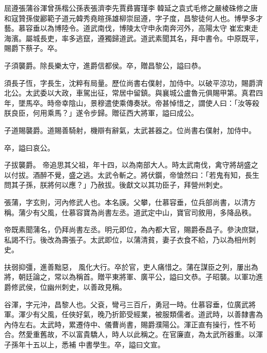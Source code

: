 
\begin{pinyinscope}

 屈遵張蒲谷渾曾孫楷公孫表張濟李先賈彞竇瑾李韓延之袁式毛修之嚴棱硃修之唐和寇贊孫俊酈範子道元韓秀堯暄孫雄柳崇屈遵，字子度，昌黎徒何人也。博學多才藝。慕容垂以為博陸令。道武南伐，博陵太守申永南奔河外，高陽太守
 崔宏東走海濱。屬城長吏，率多逃竄，遵獨歸道武。道武素聞其名，拜中書令。中原既平，賜爵下蔡子。卒。



 子須襲爵。除長樂太守，進爵信都侯。卒，贈昌黎公，謚曰恭。



 須長子恆，字長生，沈粹有局量。歷位尚書右僕射，加侍中。以破平涼功，賜爵濟北公。太武委以大政，車駕出征，常居中留鎮。與襄城公盧魯元俱賜甲第。真君四年，墜馬卒。時帝幸陰山，景穆遣使乘傳奏狀。帝甚悼惜之，謂使人曰：「汝等殺朕良臣，何用乘馬？」遂令步歸。贈征西大將軍，謚曰成公。



 子道賜襲爵。道賜善騎射，機辯有辭氣，太武甚器之。位尚書右僕射，加侍中。



 卒，謚曰哀公。



 子拔襲爵。
 帝追思其父祖，年十四，以為南部大人。時太武南伐，禽守將胡盛之以付拔。酒醉不覺，盛之逃。太武令斬之。將伏鑕，帝愴然曰：「若鬼有知，長生問其子孫，朕將何以應？」乃赦拔。後獻文以其功臣子，拜營州刺史。



 張蒲，字玄則，河內修武人也。本名謨。父攀，仕慕容垂，位兵部尚書，以清方稱。蒲少有父風，仕慕容寶為尚書左丞。道武定中山，寶官司敘用，多降品秩。



 帝既素聞蒲名，仍拜尚書左丞。明元即位，為內都大官，賜爵泰昌子。參決庶獄，私謁不行。後改為壽張子。太武即位，以蒲清貧，妻子衣食不給，乃以為相州刺史。



 扶弱抑彊，進善黜惡，
 風化大行。卒於官，吏人痛惜之。蒲在謀臣之列，屢出為將，朝廷論之，常以為稱首。贈平東將軍、廣平公，謚曰文恭。子昭襲。以軍功進爵修武侯，位幽州刺史，以善政見稱。



 谷渾，字元沖，昌黎人也。父袞，彎弓三百斤，勇冠一時。仕慕容垂，位廣武將軍。渾少有父風，任俠好氣，晚乃折節受經業，被服類儒者。道武時，以善隸書為內侍左右。太武時，累遷侍中、儀曹尚書，賜爵濮陽公。渾正直有操行，性不茍合。然愛重舊故，不以富貴驕人，時人以此稱之。在官廉直，為太武所器重。以渾子孫年十五以上，悉補
 中書學生。卒，謚曰文宣。




\end{pinyinscope}
